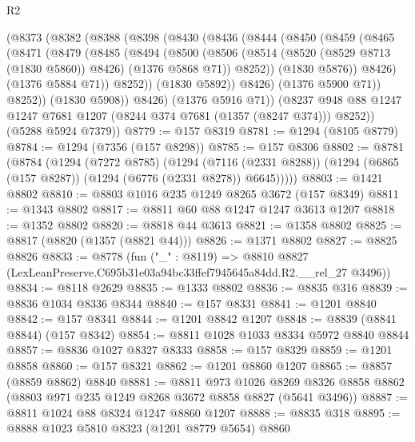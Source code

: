 \begin{lexlean}{R2}
\begin{coremodule}
      (@8373
        (@8382
          (@8388
            (@8398
              (@8430
                (@8436
                  (@8444
                    (@8450
                      (@8459
                        (@8465
                          (@8471
                            (@8479
                              (@8485
                                (@8494
                                  (@8500
                                    (@8506
                                      (@8514
                                        (@8520 (@8529 @8713 (@1830 @5860)) @8426)
                                        (@1376 @5868 @71))
                                      @8252))
                                  (@1830 @5876))
                                @8426)
                              (@1376 @5884 @71))
                            @8252))
                        (@1830 @5892))
                      @8426)
                    (@1376 @5900 @71))
                  @8252))
              (@1830 @5908))
            @8426)
          (@1376 @5916 @71))
        (@8237 @948 @88 @1247 @1247 @7681 @1207 (@8244 @374 @7681 (@1357 (@8247 @374))) @8252))
      (@5288 @5924 @7379))
@8779 := @157 @8319
@8781 := @1294 (@8105 @8779)
@8784 := @1294 (@7356 (@157 @8298))
@8785 := @157 @8306
@8802 := @8781
    (@8784
      (@1294
        (@7272 @8785)
        (@1294
          (@7116 (@2331 @8288))
          (@1294 (@6865 (@157 @8287)) (@1294 (@6776 (@2331 @8278)) @6645)))))
@8803 := @1421 @8802
@8810 := @8803 @1016 @235 @1249 @8265 @3672 (@157 @8349)
@8811 := @1343 @8802
@8817 := @8811 @60 @88 @1247 @1247 @3613 @1207
@8818 := @1352 @8802
@8820 := @8818 @44 @3613
@8821 := @1358 @8802
@8825 := @8817 (@8820 (@1357 (@8821 @44)))
@8826 := @1371 @8802
@8827 := @8825 @8826
@8833 := @8778
    (fun ("_" : @8119) =>
    @8810 @8827 (LexLeanPreserve.C695b31e03a94bc33ffef7945645a84dd.R2.__rel_27 @3496))
@8834 := @8118 @2629
@8835 := @1333 @8802
@8836 := @8835 @316
@8839 := @8836 @1034 @8336 @8344
@8840 := @157 @8331
@8841 := @1201 @8840
@8842 := @157 @8341
@8844 := @1201 @8842 @1207
@8848 := @8839 (@8841 @8844) (@157 @8342)
@8854 := @8811 @1028 @1033 @8334 @5972 @8840 @8844
@8857 := @8836 @1027 @8327 @8333
@8858 := @157 @8329
@8859 := @1201 @8858
@8860 := @157 @8321
@8862 := @1201 @8860 @1207
@8865 := @8857 (@8859 @8862) @8840
@8881 := @8811
    @973
    @1026
    @8269
    @8326
    @8858
    @8862
    (@8803 @971 @235 @1249 @8268 @3672 @8858 @8827 (@5641 @3496))
@8887 := @8811 @1024 @88 @8324 @1247 @8860 @1207
@8888 := @8835 @318
@8895 := @8888 @1023 @5810 @8323 (@1201 @8779 @5654) @8860

\end{coremodule}
\end{lexlean}
